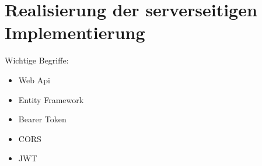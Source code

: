 \chapter{Realisierung der serverseitigen Implementierung}
\label{cha:server-impl}

Wichtige Begriffe:
\begin{itemize}
\item Web Api
\item Entity Framework

\item Bearer Token
\item CORS
\item JWT
\end{itemize}